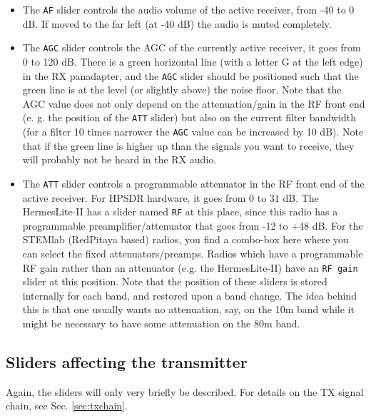 \documentclass[12pt]{book}
\def\rett#1{\texttt{\color{red}#1}}
\begin{document}
\begin{itemize}
\item{
The \rett{AF} slider controls the audio volume of the active receiver, from -40 to 0 dB. If moved to the
far left (at -40 dB) the audio is muted completely.}

\item{
The \rett{AGC} slider controls the AGC of the currently active receiver, it goes from 0 to 120 dB. There
is a green horizontal line (with a letter G at the left edge) in the RX panadapter, and the \rett{AGC}
slider should be positioned such that the green line is at the level (or slightly above) the noise
floor. Note that the AGC value does not only depend on the attenuation/gain in the RF front end
(e. g. the position of the \rett{ATT} slider) but also on the current filter bandwidth (for a filter
10 times narrower the \rett{AGC} value can be increased by 10 dB). Note that if the green line
is higher up than the signals you want to receive, they will probably not be heard in the
RX audio.}

\item{
The \rett{ATT} slider controls a programmable attenuator in the RF front end of the active receiver. For
HPSDR hardware, it goes from 0 to 31 dB. The HermesLite-II has a slider named \rett{RF} at this place,
since this radio has a programmable preamplifier/attenuator that goes from -12 to +48 dB. For the STEMlab
(RedPitaya based) radios, you find a combo-box here where you can select the fixed attenuators/preamps.
Radios which have a programmable RF gain rather than an attenuator (e.g. the HermesLite-II) have an
\rett{RF gain} slider at this position. Note that the position of these sliders is stored internally
for each band, and restored upon a band change. The idea behind this is that one usually wants no
attenuation, say, on the 10m band while it might be necessary to have some attenuation on the 80m band.}
\end{itemize}

\subsection{Sliders affecting the transmitter}
Again, the sliders will only very briefly be described. For details on the TX signal chain,
see Sec. \ref{sec:txchain}.
\end{document}
